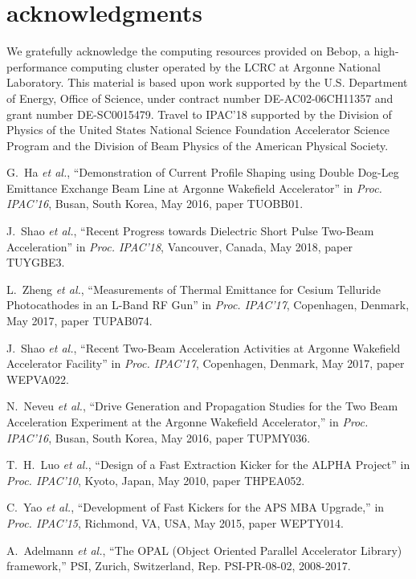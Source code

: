 \documentclass[letterpaper,  %
              ]{jacow-2_3}   %
\begin{document}
\section{acknowledgments}
We gratefully acknowledge the computing resources
provided on Bebop, a high-performance computing cluster
operated by the LCRC at Argonne National Laboratory.
This material is based upon work supported by the 
U.S. Department of Energy, Office of Science, under 
contract number DE-AC02-06CH11357 and grant number DE-SC0015479. 
Travel to IPAC'18 supported by the Division of Physics 
of the United States National Science Foundation 
Accelerator Science Program and the Division of 
Beam Physics of the American Physical Society.


\begin{thebibliography}{9}
G.~Ha \emph{et al.}, “Demonstration of Current Profile 
Shaping using Double Dog-Leg Emittance Exchange Beam 
Line at Argonne Wakefield Accelerator”
in \textit{Proc. IPAC’16}, 
Busan, South Korea, May 2016, 
paper TUOBB01.

J.~Shao \emph{et al.}, 
“Recent Progress towards Dielectric Short Pulse Two-Beam Acceleration”
in \textit{Proc. IPAC’18}, 
Vancouver, Canada, May 2018, 
paper TUYGBE3.

L.~Zheng \emph{et al.}, “Measurements of Thermal Emittance 
for Cesium Telluride Photocathodes in an L-Band RF Gun”
in \textit{Proc. IPAC’17}, 
Copenhagen, Denmark, May 2017, 
paper TUPAB074.

J.~Shao \emph{et al.}, “Recent Two-Beam 
Acceleration Activities at Argonne Wakefield Accelerator Facility”
in \textit{Proc. IPAC’17}, 
Copenhagen, Denmark, May 2017, 
paper WEPVA022.

N.~Neveu \emph{et al.}, 
“Drive Generation and Propagation Studies for the Two
Beam Acceleration Experiment at the Argonne Wakefield
Accelerator,”
in \emph{Proc. IPAC'16}, 
Busan, South Korea, May 2016, 
paper TUPMY036.

T.~H.~Luo \emph{et al.}, “Design of a Fast
Extraction Kicker for the ALPHA Project”
in \textit{Proc. IPAC’10}, 
Kyoto, Japan, May 2010, 
paper THPEA052.

C.~Yao \emph{et al.}, 
“Development of Fast Kickers for the APS
MBA Upgrade,”
in \emph{Proc. IPAC'15}, 
Richmond, VA, USA, May 2015, 
paper WEPTY014.

A.~Adelmann \emph{et al.},
“The OPAL (Object Oriented Parallel Accelerator Library) framework,”
PSI, Zurich, Switzerland,
Rep. PSI-PR-08-02, 2008-2017.

\end{thebibliography}
\end{document}
